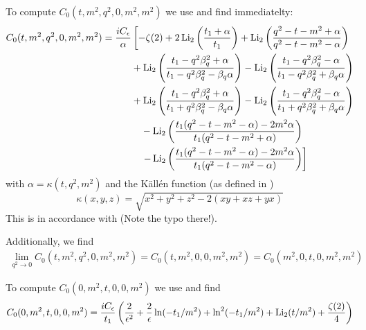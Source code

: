 To compute $C_0(t,m^2,q^2,0,m^2,m^2)$ we use \cite{Denner:1991qq} and find immediatelty:
\begin{align}
C_0(t,m^2,q^2,0,m^2,m^2) &= \frac{i C_\epsilon}{\alpha}\left[-\zeta(2)+2\operatorname{\text{Li}_2}\left(\frac{t_1+\alpha}{t_1}\right)+\operatorname{\text{Li}_2}\left(\frac{q^2-t-m^2+\alpha}{q^2-t-m^2-\alpha}\right)\right.\nonumber\\
&\hspace{30pt}+\operatorname{\text{Li}_2}\left(\frac{t_1-q^2\beta_q^2+\alpha}{t_1-q^2\beta_q^2-\beta_q\alpha}\right)-\operatorname{\text{Li}_2}\left(\frac{t_1-q^2\beta_q^2-\alpha}{t_1-q^2\beta_q^2+\beta_q\alpha}\right)\nonumber\\
&\hspace{30pt}+\operatorname{\text{Li}_2}\left(\frac{t_1-q^2\beta_q^2+\alpha}{t_1+q^2\beta_q^2-\beta_q\alpha}\right)-\operatorname{\text{Li}_2}\left(\frac{t_1-q^2\beta_q^2-\alpha}{t_1+q^2\beta_q^2+\beta_q\alpha}\right)\nonumber\\
&\hspace{40pt}-\operatorname{\text{Li}_2}\left(\frac{t_1(q^2-t-m^2-\alpha)-2m^2\alpha}{t_1(q^2-t-m^2+\alpha)}\right)\nonumber\\
&\hspace{40pt}\left.-\operatorname{\text{Li}_2}\left(\frac{t_1(q^2-t-m^2-\alpha)-2m^2\alpha}{t_1(q^2-t-m^2-\alpha)}\right)\right]
\end{align}
with $\alpha=\kappa(t,q^2,m^2)$ and the Källén function (as defined in \cite[eq. (4.27)]{Denner:1991qq})
\begin{equation}
\kappa(x,y,z)=\sqrt{x^2+y^2+z^2-2(xy+xz+yx)}
\end{equation}
This is in accordance with \cite[eq. (A.8)]{Laenen1993162}(Note the typo there!).

Additionally, we find
\begin{align}
\lim_{q^2\rightarrow 0}C_0(t,m^2,q^2,0,m^2,m^2) = C_0(t,m^2,0,0,m^2,m^2) = C_0(m^2,0,t,0,m^2,m^2)
\end{align}

To compute $C_0(0,m^2,t,0,0,m^2)$ we use \cite{Bojak:2000eu} and find
\begin{equation}
C_0(0,m^2,t,0,0,m^2)=\frac{iC_\epsilon}{t_1}\left(\frac 2 {\epsilon^2}+\frac 2 {\epsilon}\ln(-t_1/m^2)+\ln^2(-t_1/m^2)+\operatorname{\text{Li}_2}(t/m^2)+\frac{\zeta(2)}4\right)
\end{equation}

